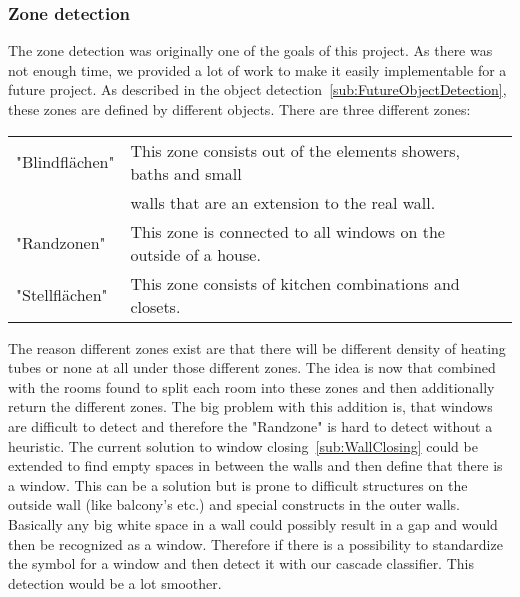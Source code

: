 \subsubsection{Zone detection}
\label{sub:ZoneDetection}
The zone detection was originally one of the goals of this project. As there was not enough time, we provided a lot of work to make it easily implementable for a future project. As described in the object detection~\ref{sub:FutureObjectDetection}, these zones are defined by different objects.
There are three different zones:
\begin{table}[h]
	\centering
	\label{tab:Zones}
	\begin{tabular}{@{}lll@{}}
		"Blindflächen" & This zone consists out of the elements showers, baths and small \\
		& walls that are an extension to the real wall.\\
		"Randzonen" &  This zone is connected to all windows on the outside of a house. \\
		"Stellflächen" & This zone consists of kitchen combinations and closets.\\
	\end{tabular}
\end{table}	

The reason different zones exist are that there will be different density of heating tubes or none at all under those different zones. The idea is now that combined with the rooms found to split each room into these zones and then additionally return the different zones. The big problem with this addition is, that windows are difficult to detect and therefore the "Randzone" is hard to detect without a heuristic. The current solution to window closing~\ref{sub:WallClosing} could be extended to find empty spaces in between the walls and then define that there is a window. This can be a solution but is prone to difficult structures on the outside wall (like balcony's etc.) and special constructs in the outer walls. Basically any big white space in a wall could possibly result in a gap and would then be recognized as a window. Therefore if there is a possibility to standardize the symbol for a window and then detect it with our cascade classifier. This detection would be a lot smoother.

